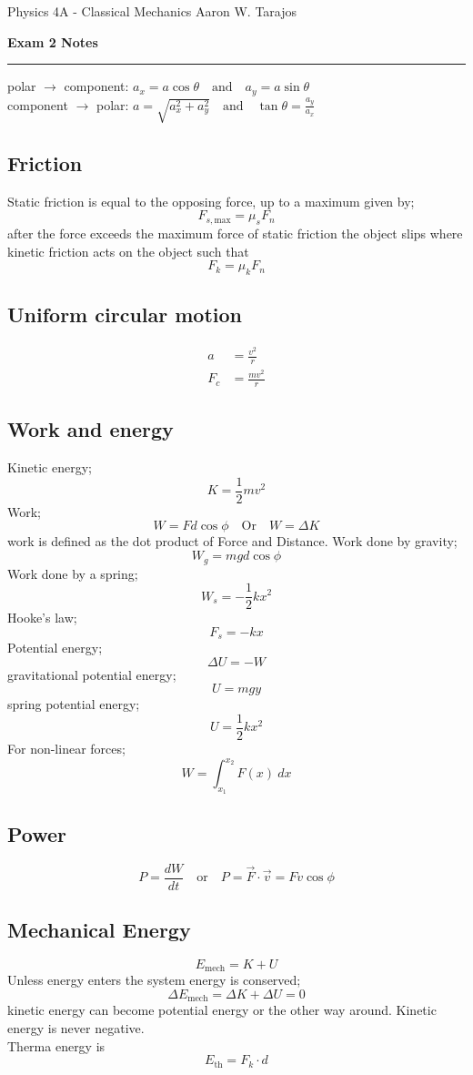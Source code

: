 \documentclass{article}
\begin{document}
\noindent
Physics 4A - Classical Mechanics \hfill Aaron W. Tarajos
\begin{center}
	\textbf{Exam 2 Notes}
\end{center}

\noindent\rule{\textwidth}{0.4pt}

\begin{multicols}{2}
\flushleft
polar $\to$ component: $a_x = a\cos\theta \quad \text{and} \quad a_y = a\sin\theta$\\
component $\to$ polar: $a = \sqrt{a_x^2 + a_y^2} \quad \text{and} \quad \tan\theta = \frac{a_y}{a_x}$
\subsection*{Friction}
Static friction is equal to the opposing force, up to a maximum given by;
\[
	F_{s,\text{max}} = \mu_s F_n
\]
after the force exceeds the maximum force of static friction the object slips where kinetic friction acts on the object such that
\[
	F_k = \mu_k F_n
\]

\subsection*{Uniform circular motion}
\begin{align*}
	a &= \frac{v^2}{r} \\
	F_c &= \frac{mv^2}{r}
\end{align*}

\subsection*{Work and energy}
Kinetic energy;
\[
	K = \frac{1}{2}mv^2
\]
Work;
\[
	W = Fd \cos \phi \quad \text{Or} \quad W = \Delta K
\]
work is defined as the dot product of Force and Distance. Work done by gravity;
\[
	W_g = mgd \cos \phi
\]
Work done by a spring;
\[
	W_s = -\frac{1}{2}kx^2
\]
Hooke's law;
\[
	F_s = -kx
\]
Potential energy;
\[
	\Delta U = -W
\]
gravitational potential energy;
\[
	U = mgy
\]
spring potential energy;
\[
	U = \frac{1}{2}kx^2
\]
For non-linear forces;
\[
	W = \int_{x_1}^{x_2} F(x)\ dx
\]

\subsection*{Power}
\[
	P = \frac{dW}{dt} \quad \text{or} \quad P = \vec{F} \cdot \vec{v} = Fv \cos \phi
\]

\subsection*{Mechanical Energy}
\[
	E_\text{mech} = K + U
\]
Unless energy enters the system energy is conserved;
\[
	\Delta E_\text{mech} = \Delta K + \Delta U = 0
\]
kinetic energy can become potential energy or the other way around. Kinetic energy is never negative.\\
Therma energy is
\[
	E_\text{th} = F_k \cdot d
\]


\end{multicols}
\end{document}

